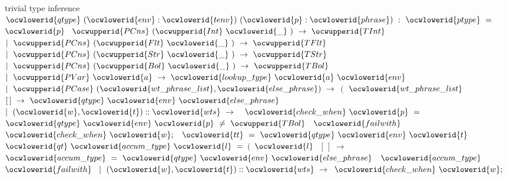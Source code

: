 \documentclass[12pt]{article}
\begin{document}
\ocwendcode{}\ocwindent{0.00em}
trivial type inference 
\ocweol
\label{rellens.ml:2830}%
\medskip
\ocwbegincode{}\ocwindent{0.00em}
~~$\ocwlowerid{qtype}~(\ocwlowerid{env}:\ocwlowerid{tenv})~(\ocwlowerid{p}:\ocwlowerid{phrase})~:~\ocwlowerid{ptype}~=~$~$\ocwlowerid{p}~$\ocweol
\ocwindent{1.00em}
$\ocwupperid{PCns}~(\ocwupperid{Int}~\ocwlowerid{\_}~)~\rightarrow{}~\ocwupperid{TInt}$\ocweol
\ocwindent{0.00em}
$\mid{}~\ocwupperid{PCns}~(\ocwupperid{Flt}~\ocwlowerid{\_}~)~\rightarrow{}~\ocwupperid{TFlt}$\ocweol
\ocwindent{0.00em}
$\mid{}~\ocwupperid{PCns}~(\ocwupperid{Str}~\ocwlowerid{\_}~)~\rightarrow{}~\ocwupperid{TStr}$\ocweol
\ocwindent{0.00em}
$\mid{}~\ocwupperid{PCns}~(\ocwupperid{Bol}~\ocwlowerid{\_}~)~\rightarrow{}~\ocwupperid{TBol}$\ocweol
\ocwindent{0.00em}
$\mid{}~\ocwupperid{PVar}~\ocwlowerid{a}~\rightarrow{}~\ocwlowerid{lookup\_type}~\ocwlowerid{a}~\ocwlowerid{env}~$\ocweol
\ocwindent{0.00em}
$\mid{}~\ocwupperid{PCase}~(\ocwlowerid{wt\_phrase\_list},\ocwlowerid{else\_phrase})~\rightarrow{}$\ocweol
\ocwindent{2.00em}
$($~$\ocwlowerid{wt\_phrase\_list}~$\ocweol
\ocwindent{3.00em}
$[\,]~\rightarrow{}~\ocwlowerid{qtype}~\ocwlowerid{env}~\ocwlowerid{else\_phrase}$\ocweol
\ocwindent{2.00em}
$\mid{}~(\ocwlowerid{w},\ocwlowerid{t})::\ocwlowerid{wts}~\rightarrow{}$\ocweol
\ocwindent{4.00em}
~$\ocwlowerid{check\_when}~\ocwlowerid{p}~=$\ocweol
\ocwindent{5.00em}
~$\ocwlowerid{qtype}~\ocwlowerid{env}~\ocwlowerid{p}~\not=~\ocwupperid{TBol}~$~$\ocwlowerid{failwith}~$~\ocweol
\ocwindent{4.00em}
$\ocwlowerid{check\_when}~\ocwlowerid{w};$\ocweol
\ocwindent{4.00em}
~$\ocwlowerid{tt}~=~\ocwlowerid{qtype}~\ocwlowerid{env}~\ocwlowerid{t}~$\ocweol
\ocwindent{4.00em}
~~$\ocwlowerid{qt}~\ocwlowerid{accum\_type}~\ocwlowerid{l}~=$\ocweol
\ocwindent{5.00em}
$($~$\ocwlowerid{l}~$\ocweol
\ocwindent{6.00em}
$[\,]~\rightarrow{}$\ocweol
\ocwindent{7.00em}
~$\ocwlowerid{accum\_type}~=~\ocwlowerid{qtype}~\ocwlowerid{env}~\ocwlowerid{else\_phrase}~$~$\ocwlowerid{accum\_type}~$\ocweol
\ocwindent{7.00em}
$\ocwlowerid{failwith}~$\ocweol
\ocwindent{5.00em}
$\mid{}~(\ocwlowerid{w},\ocwlowerid{t})::\ocwlowerid{wts}~\rightarrow{}$\ocweol
\ocwindent{7.00em}
$\ocwlowerid{check\_when}~\ocwlowerid{w};$\ocweol
\end{document}
